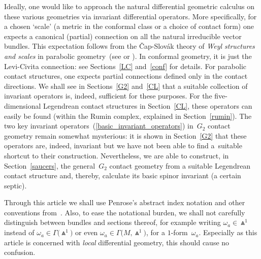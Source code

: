 \documentclass[pdftex]{sigma}%
\numberwithin{equation}{section}
\begin{document}
Ideally, one would like to approach the natural differential geometric calculus
on these various geometries via invariant differential operators. More
specifically, for a chosen `scale' (a metric in the conformal class or a choice
of contact form) one expects a canonical (partial) connection on all the
natural irreducible vector bundles. This expectation follows from the
\v{C}ap-Slov\'ak theory of {\em Weyl structures and scales} in parabolic
geometry~(see \cite{CSweyl} or \cite[Section~5.1]{CS}). In conformal geometry, it is
just the Levi-Civita connection: see Sections~\ref{LC} and~\ref{conf} for details.
For parabolic contact structures, one expects partial connections defined only
in the contact directions. We shall see in Sections~\ref{G2} and~\ref{CL} that a
suitable collection of invariant operators is, indeed, sufficient for these
purposes. For the five-dimensional Legendrean contact structures
in Section~\ref{CL}, these operators can easily be found (within the Rumin complex,
explained in Section~\ref{rumin}). The two key invariant operators~(\ref{basic_invariant_operators}) in~$G_2$ contact geometry remain somewhat
mysterious: it is shown in Section~\ref{G2} that these operators are, indeed,
invariant but we have not been able to find a~suitable shortcut to their
construction. Nevertheless, we are able to construct, in Section~\ref{saucers}, the
general~$G_2$ contact geometry from a suitable Legendrean contact structure
and, thereby, calculate its basic spinor invariant (a certain septic).

Through this article we shall use Penrose's abstract index notation and other
conventions from~\cite{OT}. Also, to ease the notational burden, we shall not
carefully distinguish between bundles and sections thereof, for example writing
$\omega_a\in\Wedge^1$ instead of $\omega_a\in\Gamma\big({\Wedge}^1\big)$ or even
$\omega_a\in\Gamma\big(M,\Wedge^1\big)$, for a $1$-form~$\omega_a$. Especially as this
article is concerned with {\em local} differential geometry, this should
cause no confusion.
\end{document}
